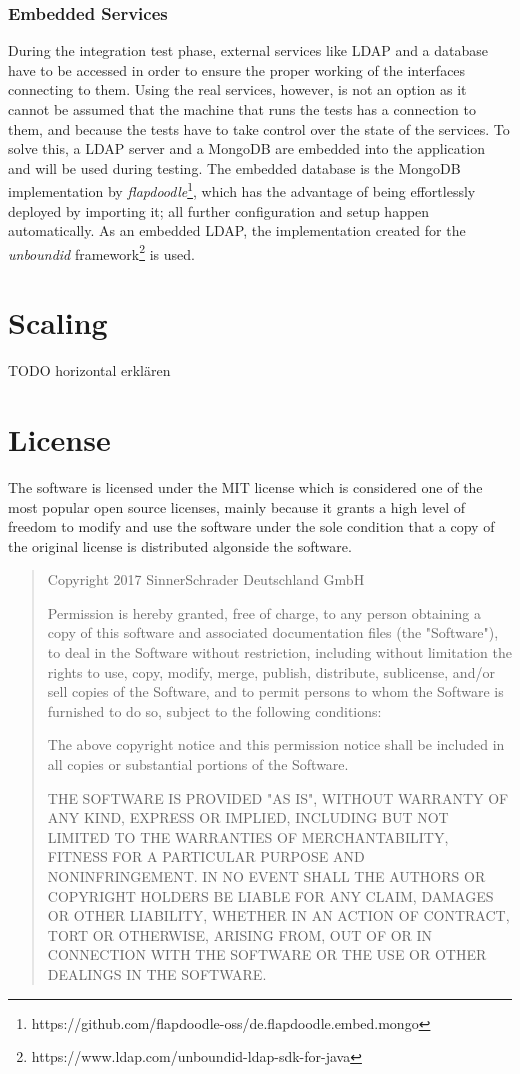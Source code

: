 \subsubsection{Embedded Services}
During the integration test phase, external services like LDAP and a database have to be accessed in order to ensure the proper working of the interfaces connecting to them. Using the real services, however, is not an option as it cannot be assumed that the machine that runs the tests has a connection to them, and because the tests have to take control over the state of the services. To solve this, a LDAP server and a MongoDB are embedded into the application and will be used during testing.
The embedded database is the MongoDB implementation by \textit{flapdoodle}\footnote{https://github.com/flapdoodle-oss/de.flapdoodle.embed.mongo}, which has the advantage of being effortlessly deployed by importing it; all further configuration and setup happen automatically. As an embedded LDAP, the implementation created for the \textit{unboundid} framework\footnote{https://www.ldap.com/unboundid-ldap-sdk-for-java} is used.

\section{Scaling}
TODO horizontal erklären

\section{License}
The software is licensed under the MIT license \cite{license} which is considered one of the most popular open source licenses, mainly because it grants a high level of freedom to modify and use the software under the sole condition that a copy of the original license is distributed algonside the software.

\begin{quote}
Copyright 2017 SinnerSchrader Deutschland GmbH

Permission is hereby granted, free of charge, to any person obtaining a copy of this software and associated documentation files (the "Software"), to deal in the Software without restriction, including without limitation the rights to use, copy, modify, merge, publish, distribute, sublicense, and/or sell copies of the Software, and to permit persons to whom the Software is furnished to do so, subject to the following conditions:

The above copyright notice and this permission notice shall be included in all copies or substantial portions of the Software.

THE SOFTWARE IS PROVIDED "AS IS", WITHOUT WARRANTY OF ANY KIND, EXPRESS OR IMPLIED, INCLUDING BUT NOT LIMITED TO THE WARRANTIES OF MERCHANTABILITY, FITNESS FOR A PARTICULAR PURPOSE AND NONINFRINGEMENT. IN NO EVENT SHALL THE AUTHORS OR COPYRIGHT HOLDERS BE LIABLE FOR ANY CLAIM, DAMAGES OR OTHER LIABILITY, WHETHER IN AN ACTION OF CONTRACT, TORT OR OTHERWISE, ARISING FROM, OUT OF OR IN CONNECTION WITH THE SOFTWARE OR THE USE OR OTHER DEALINGS IN THE SOFTWARE.
\end{quote}\cite{license}
